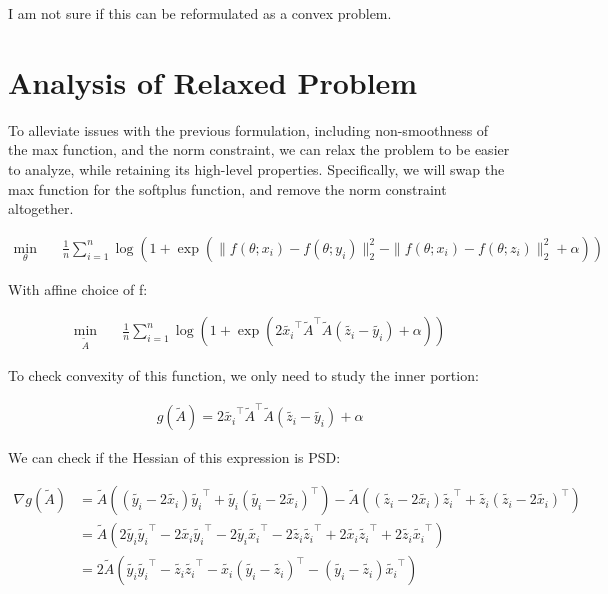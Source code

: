 \documentclass[11pt]{article}
\begin{document}
I am not sure if this can be reformulated as a convex problem.

\section{Analysis of Relaxed Problem}

To alleviate issues with the previous formulation, including non-smoothness of the max function, and the norm constraint, we can relax the problem to be easier to analyze, while retaining its high-level properties. Specifically, we will swap the max function for the softplus function, and remove the norm constraint altogether.

\begin{equation}
\begin{aligned}
    \min_{\theta} \quad & \frac{1}{n} \sum_{i=1}^{n} \log{(1 + \exp{( \| f(\theta; x_i) - f(\theta; y_i)\|_2^2 - \| f(\theta; x_i) - f(\theta; z_i)\|_2^2 + \alpha)})}
\end{aligned}
\end{equation}

With affine choice of f:

\begin{equation}
\label{eq:smooth_problem}
\begin{aligned}
    \min_{\tilde{A}} \quad & \frac{1}{n} \sum_{i=1}^{n} \log{(1 + \exp{( 2\tilde{x_i}^\top\tilde{A}^\top\tilde{A}(\tilde{z_i} - \tilde{y_i}) + \alpha)})}
\end{aligned}
\end{equation}

To check convexity of this function, we only need to study the inner portion:

\begin{equation}
\begin{aligned}
g(\tilde{A}) = 2\tilde{x_i}^\top\tilde{A}^\top\tilde{A}(\tilde{z_i} - \tilde{y_i}) + \alpha
\end{aligned}
\end{equation}

We can check if the Hessian of this expression is PSD:

\begin{align*}
\nabla{g(\tilde{A})} 
&= \tilde{A}((\tilde{y_i} - 2\tilde{x_i})\tilde{y_i}^\top + \tilde{y_i}(\tilde{y_i} - 2\tilde{x_i})^\top) - \tilde{A}((\tilde{z_i} - 2\tilde{x_i})\tilde{z_i}^\top + \tilde{z_i}(\tilde{z_i} - 2\tilde{x_i})^\top) \\
&= \tilde{A}(2\tilde{y_i}\tilde{y_i}^\top - 2\tilde{x_i}\tilde{y_i}^\top - 2\tilde{y_i}\tilde{x_i}^\top- 2\tilde{z_i}\tilde{z_i}^\top + 2\tilde{x_i}\tilde{z_i}^\top + 2\tilde{z_i}\tilde{x_i}^\top) \\
&= 2\tilde{A}(\tilde{y_i}\tilde{y_i}^\top - \tilde{z_i}\tilde{z_i}^\top - \tilde{x_i}(\tilde{y_i} - \tilde{z_i})^\top - (\tilde{y_i} - \tilde{z_i})\tilde{x_i}^\top) \\
\end{align*}
\end{document}
